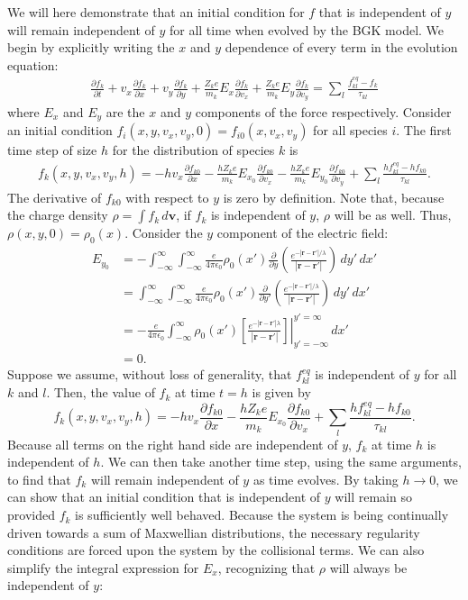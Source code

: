 \documentclass{article}
\begin{document}
We will here demonstrate that an initial condition for $f$ that is independent of $y$ will remain independent of $y$ for all time when evolved by the BGK model. We begin by explicitly writing the $x$ and $y$ dependence of every term in the evolution equation:
\begin{align*}
\frac{\partial f_k}{\partial t}+v_x\frac{\partial f_k}{\partial x}+v_y\frac{\partial f_k}{\partial y}+\frac{Z_ke}{m_k}E_x\frac{\partial f_k}{\partial v_x}+\frac{Z_ke}{m_k}E_y\frac{\partial f_k}{\partial v_y}=\sum_l\frac{f_{kl}^{eq}-f_k}{\tau_{kl}}
\end{align*}where $E_x$ and $E_y$ are the $x$ and $y$ components of the force respectively. Consider an initial condition $f_i(x,y,v_x,v_y,0)=f_{i0}(x,v_x,v_y)$ for all species $i$. The first time step of size $h$ for the distribution of species $k$ is
\begin{align*}
f_k(x,y,v_x,v_y,h)=-hv_x\frac{\partial f_{k0}}{\partial x}-\frac{hZ_k e}{m_k}E_{x_0}\frac{\partial f_{k0}}{\partial v_x}-\frac{hZ_k e}{m_k}E_{y_0}\frac{\partial f_{k0}}{\partial v_y}+\sum_l\frac{hf_{kl}^{eq}-hf_{k0}}{\tau_{kl}}.
\end{align*}The derivative of $f_{k0}$ with respect to $y$ is zero by definition. Note that, because the charge density $\rho=\int f_{k}\,d\mathbf{v}$, if $f_k$ is independent of $y$, $\rho$ will be as well. Thus, $\rho(x,y,0)=\rho_0(x)$. Consider the $y$ component of the electric field:
\begin{align*}
E_{y_0}&=-\int_{-\infty}^\infty\int_{-\infty}^\infty \frac{e}{4\pi \epsilon_0}\rho_0(x')\frac{\partial}{\partial y}\left(\frac{e^{-|\mathbf{r}-\mathbf{r}'|/\lambda}}{|\mathbf{r}-\mathbf{r}'|}\right)\,dy'\,dx'\\
&=\int_{-\infty}^\infty\int_{-\infty}^\infty \frac{e}{4\pi \epsilon_0}\rho_0(x')\frac{\partial}{\partial y'}\left(\frac{e^{-|\mathbf{r}-\mathbf{r}'|/\lambda}}{|\mathbf{r}-\mathbf{r}'|}\right)\,dy'\,dx'\\
&=-\frac{e}{4\pi\epsilon_0}\int_{-\infty}^\infty \rho_0(x')\left.\left[\frac{e^{-|\mathbf{r}-\mathbf{r}'|\lambda}}{|\mathbf{r}-\mathbf{r}'|}\right]\right|_{y'=-\infty}^{y'=\infty}\,dx'\\
&=0.
\end{align*}Suppose we assume, without loss of generality, that $f_{kl}^{eq}$ is independent of $y$ for all $k$ and $l$. Then, the value of $f_k$ at time $t=h$ is given by
\[f_k(x,y,v_x,v_y,h)=-hv_x\frac{\partial f_{k0}}{\partial x}-\frac{hZ_k e}{m_k}E_{x_0}\frac{\partial f_{k0}}{\partial v_x}+\sum_l\frac{hf_{kl}^{eq}-hf_{k0}}{\tau_{kl}}.
\]Because all terms on the right hand side are independent of $y$, $f_k$ at time $h$ is independent of $h$. We can then take another time step, using the same arguments, to find that $f_k$ will remain independent of $y$ as time evolves. By taking $h\to0$, we can show that an initial condition that is independent of $y$ will remain so provided $f_k$ is sufficiently well behaved. Because the system is being continually driven towards a sum of Maxwellian distributions, the necessary regularity conditions are forced upon the system by the collisional terms. We can also simplify the integral expression for $E_x$, recognizing that $\rho$ will always be independent of $y$:
\end{document}
